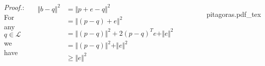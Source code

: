 \documentclass[aspectratio=169]{beamer}
\newcommand{\incfig}[2][1]{%
    \def\svgwidth{#1\columnwidth}
    {#2.pdf_tex} }
\begin{document}
\begin{frame}{} %
	
	\begin{columns}
	
	

{\color{violet} \textit{Proof.}:} For any $q \in \mathcal{L}$ we have

\begin{align*}
	\Vert b-q \Vert^2 &=  \Vert  p + e - q \Vert^2\\ 
	&= \Vert (p - q) + e \Vert^2 \\
	&= \Vert (p - q) \Vert^2  + 2(p-q)^Te+ \Vert e \Vert^2\\ 
	&= \Vert (p - q) \Vert^2 + \Vert e \Vert^2 \\
	& \geq \Vert e \Vert^2
\end{align*}
		
		
\begin{figure}[ht]
    \centering
    \incfig{pitagoras}
    \label{fig:pitagoras}
\end{figure}

\end{columns}

\end{frame}

\begin{comment}

\begin{frame} %
	\frametitle{Little Recall}
	\framesubtitle{Linear mappings with non-sqare matrix}
	
\begin{figure}[ht]
    \centering
    \incfig{lineartrans}
    \label{fig:lineartrans}
\end{figure}

\end{frame}

\end{comment}
\end{document}
